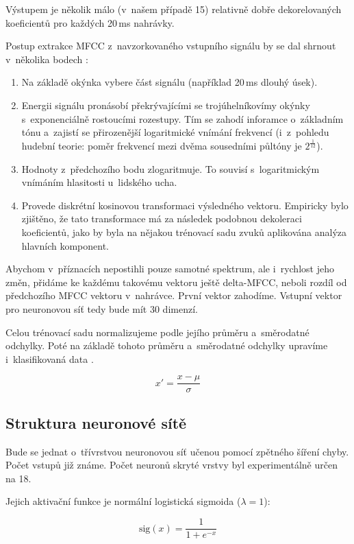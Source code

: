 \documentclass[10pt,a4paper,twocolumn]{article}
\begin{document}
Výstupem je několik málo (v~našem případě 15) relativně dobře dekorelovaných koeficientů
pro každých 20\,ms nahrávky.

Postup extrakce MFCC z~navzorkovaného vstupního signálu by se dal shrnout v~několika bodech \cite{mfccwiki}:

\begin{enumerate}
  \item Na základě okýnka vybere část signálu (například 20\,ms dlouhý úsek).
  \item Energii signálu pronásobí překrývajícími se trojúhelníkovímy okýnky s~exponenciálně rostoucími rozestupy.
        Tím se zahodí inforamce o~základním tónu a~zajistí se přirozenější logaritmické vnímání frekvencí
        (i~z~pohledu hudební teorie: poměr frekvencí mezi dvěma sousedními půltóny je $2^{\frac{1}{12}}$).
  \item Hodnoty z~předchozího bodu zlogaritmuje. To souvisí s~logaritmickým vnímáním hlasitosti u~lidského ucha.
  \item Provede diskrétní kosinovou transformaci výsledného vektoru. Empiricky bylo zjištěno, že tato transformace
        má za následek podobnou dekoleraci koeficientů, jako by byla na nějakou trénovací sadu zvuků aplikována
        analýza hlavních komponent.
\end{enumerate}

Abychom v~příznacích nepostihli pouze samotné spektrum, ale i~rychlost jeho změn,
přidáme ke každému takovému vektoru ještě delta-MFCC, neboli rozdíl
od předchozího MFCC vektoru v~nahrávce. První vektor zahodíme.
Vstupní vektor pro neuronovou síť tedy bude mít 30 dimenzí.

Celou trénovací sadu normalizujeme podle jejího průměru a~směrodatné odchylky.
Poté na základě tohoto průměru a~směrodatné odchylky upravíme i~klasifikovaná data \cite{nnfaq}.

$$ x' = \frac{x-\mu}{\sigma} $$

\subsection{Struktura neuronové sítě}

Bude se jednat o~třívrstvou neuronovou síť učenou pomocí zpětného šíření chyby.
Počet vstupů již známe.
Počet neuronů skryté vrstvy byl experimentálně určen na 18.

Jejich aktivační funkce je normální logistická sigmoida ($\lambda = 1$):

$$ \mbox{sig}(x) = \frac{1}{1+e^{-x}} $$
\end{document}
